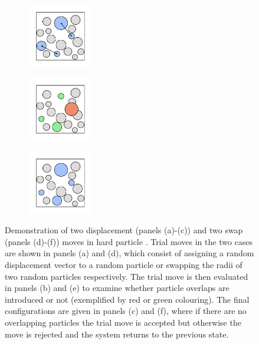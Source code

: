 \begin{figure}[bt]
     	\vspace{2mm}
       \begin{subfigure}[b]{0.25\textwidth}
         \centering
         \includegraphics[width=2.8cm]{./figures/methods/mc_move_d.pdf}
         \caption{}
         \label{fig:hardmc4}
     \end{subfigure}
     \begin{subfigure}[b]{0.25\textwidth}
         \centering
         \includegraphics[width=2.8cm]{./figures/methods/mc_move_e.pdf}
         \caption{}
         \label{fig:hardmc5}
     \end{subfigure}
     \begin{subfigure}[b]{0.25\textwidth}
         \centering
         \includegraphics[width=2.8cm]{./figures/methods/mc_move_f.pdf}
         \caption{}
         \label{fig:hardmc6}
     \end{subfigure}
   
     \caption{Demonstration of two displacement (panels (a)\--(c)) and two swap (panels (d)\--(f)) moves in hard particle \mc. Trial moves in the two cases are shown in panels (a) and (d), which consist of assigning a random displacement vector to a random particle or swapping the radii of two random particles respectively. The trial move is then evaluated in panels (b) and (e) to examine whether particle overlaps are introduced or not (exemplified by red or green colouring). The final configurations are given in panels (c) and (f), where if there are no overlapping particles the trial move is accepted but otherwise the move is rejected and the system returns to the previous state. }
     \label{fig:hardmc}
     

\end{figure}
